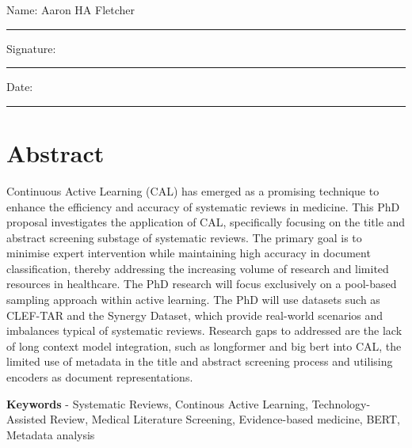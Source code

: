 \documentclass[10pt,oneside]{book}
\begin{document}
\noindent Name: Aaron HA Fletcher\\[1mm]
\rule[1em]{25em}{0.5pt}

\noindent Signature:\\[1mm]
\rule[1em]{25em}{0.5pt}

\noindent Date:\\[1mm]
\rule[1em]{25em}{0.5pt}



\chapter*{\Large \center Abstract}


 Continuous Active Learning (CAL) has emerged as a promising technique to enhance the efficiency and accuracy of systematic reviews in medicine. This PhD proposal investigates the application of CAL, specifically focusing on the title and abstract screening substage of systematic reviews. The primary goal is to minimise expert intervention while maintaining high accuracy in document classification, thereby addressing the increasing volume of research and limited resources in healthcare. The PhD research will focus exclusively on a pool-based sampling approach within active learning. The PhD will use datasets such as CLEF-TAR and the Synergy Dataset, which provide real-world scenarios and imbalances typical of systematic reviews. Research gaps to addressed are the lack of long context model integration, such as longformer and big bert into CAL, the limited use of metadata in the title and abstract screening process and utilising encoders as document representations.
    
    \smallskip
    \smallskip
    
    \textbf{Keywords} -  Systematic Reviews, Continous Active Learning, Technology-Assisted Review, Medical Literature Screening, Evidence-based medicine, BERT, Metadata analysis
\newpage
\begingroup %
\small %
\vspace*{-3cm}
\tableofcontents

\endgroup
\newpage
\newcommand{\lightshadowbox}[1]{%
  \setlength{\fboxsep}{6pt}%
  \setlength{\shadowsize}{1pt}%
  \shadowbox{#1}%
}
\end{document}
